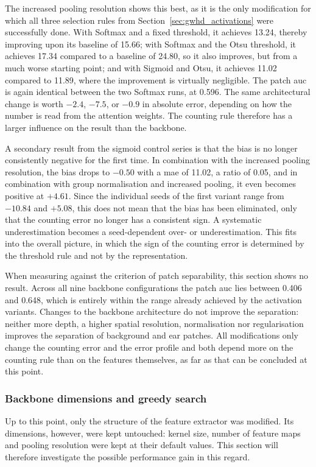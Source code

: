 \documentclass[12pt,parskip = half, DIV=classic,listof=totoc]{scrartcl}
\begin{document}
			The increased pooling resolution shows this best, as it is the only
			modification for which all three selection rules from Section~\ref{sec:gwhd_activations} were successfully done. With
			Softmax and a fixed threshold, it achieves 13.24, thereby improving upon its baseline
			of 15.66; with Softmax and the Otsu threshold, it achieves 17.34 compared to a
			baseline of 24.80, so it also improves, but from a much worse
			starting point; and with Sigmoid and Otsu, it achieves 11.02 compared to 11.89,
			where the improvement is virtually negligible. The patch \ac{auc} is again identical between the two
			Softmax runs, at 0.596. The same architectural
			change is worth $-2.4$, $-7.5$, or $-0.9$ in absolute error, depending on how
			the number is read from the attention weights. The counting rule therefore has a 
			larger influence on the result than the backbone.

			A secondary result from the sigmoid control series is that the bias is no longer consistently negative for the first time. 
			In combination with the increased pooling resolution,
			the bias drops to $-0.50$ with a \ac{mae} of 11.02, a ratio of
			0.05, and in combination with group normalisation and increased pooling, it
			even becomes positive at $+4.61$. Since the individual seeds of the first variant range from $-10.84$
			and $+5.08$, this does not mean that the bias has been eliminated, only that the counting error no longer has a consistent sign.
			A systematic underestimation becomes a seed-dependent over- or underestimation. This
			fits into the overall picture, in which the sign of the counting error is determined by the
			threshold rule and not by the representation.

			When measuring against the criterion of patch separability, this section shows no result. 
			Across all nine backbone configurations the patch \ac{auc} lies between 0.406 and 0.648, which is entirely 
			within the range already achieved by the activation variants. Changes to the backbone architecture do not improve the separation:
			neither more depth, a higher spatial resolution, normalisation nor regularisation improves
			the separation of background and ear patches. All modifications only change the counting error and the error profile
			and both depend more on the counting rule than on the features themselves, as far as that can be concluded at this point.

			\subsubsection{Backbone dimensions and greedy search}\label{sec:gwhd_greedy}
			Up to this point, only the structure of the feature extractor was modified. Its dimensions, however, were
			kept untouched: kernel size, number of feature maps and pooling resolution were kept at their default values.
			This section will therefore investigate the possible performance gain in this regard.
\end{document}
